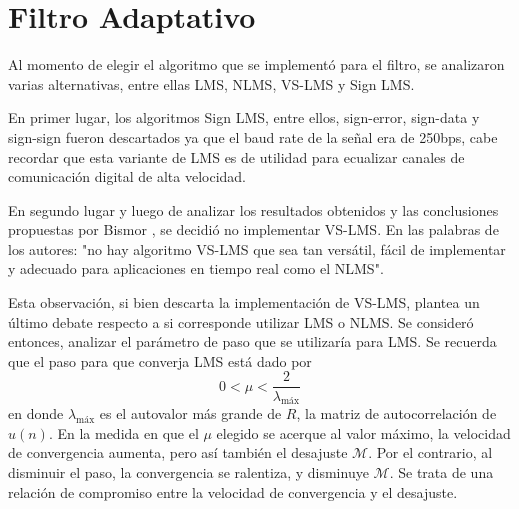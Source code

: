 \documentclass[main.tex]{subfiles}
\begin{document}
\section{Filtro Adaptativo}
Al momento de elegir el algoritmo que se implementó para el filtro, 
se analizaron varias alternativas, entre ellas LMS, NLMS, VS-LMS y Sign LMS.

En primer lugar, los algoritmos Sign LMS, entre ellos, sign-error, sign-data
y sign-sign fueron descartados ya que el baud rate de la señal era de 250bps,
cabe recordar que esta variante de LMS es de utilidad para ecualizar canales de
comunicación digital de alta velocidad. 

En segundo lugar y  luego de analizar 
los resultados obtenidos y las conclusiones propuestas por Bismor \cite{bismor},
se decidió no implementar VS-LMS. En las palabras de los autores: 
"no hay algoritmo VS-LMS que sea tan versátil, fácil de implementar y adecuado 
para aplicaciones en tiempo real como el NLMS".\newline

Esta observación, si bien descarta la implementación de VS-LMS, 
plantea un último debate respecto a si corresponde utilizar LMS o NLMS. 
Se consideró entonces, analizar el parámetro de paso que se utilizaría para LMS. 
Se recuerda que el paso para que converja LMS está dado por
\begin{equation}
    0<\mu<\frac{2}{\lambda_\text{máx}}
\end{equation}
en donde $\lambda_\text{máx}$ es el autovalor más grande de $R$, la matriz de 
autocorrelación de $u(n)$. En la medida en que el  $\mu$ elegido se acerque 
al valor máximo, la velocidad de convergencia aumenta, pero así también el desajuste $\mathscr{M}$.
Por el contrario, al disminuir el paso, la convergencia se ralentiza, y disminuye $\mathscr{M}$. 
Se trata de una relación de compromiso entre la velocidad de convergencia y el desajuste.
\end{document}
